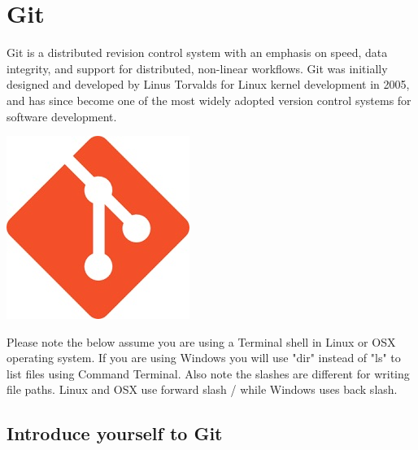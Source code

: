\chapter{Git}
Git is a distributed revision control system with an emphasis on speed, data integrity, and support for distributed, non-linear workflows.  Git was initially designed and developed by Linus Torvalds for Linux kernel development in 2005, and has since become one of the most widely adopted version control systems for software development.
\begin{marginfigure}%
  \includegraphics[width=\linewidth]{download.jpg}
  \label{fig:marginfig}
\end{marginfigure}
Please note the below assume you are using a Terminal shell in Linux or OSX operating system. If you are using Windows you will use "dir" instead of "ls" to list files using Command Terminal. Also note the slashes are different for writing file paths. Linux and OSX use forward slash / while Windows uses back slash.

\vspace{1cm}

\section{Introduce yourself to Git}


